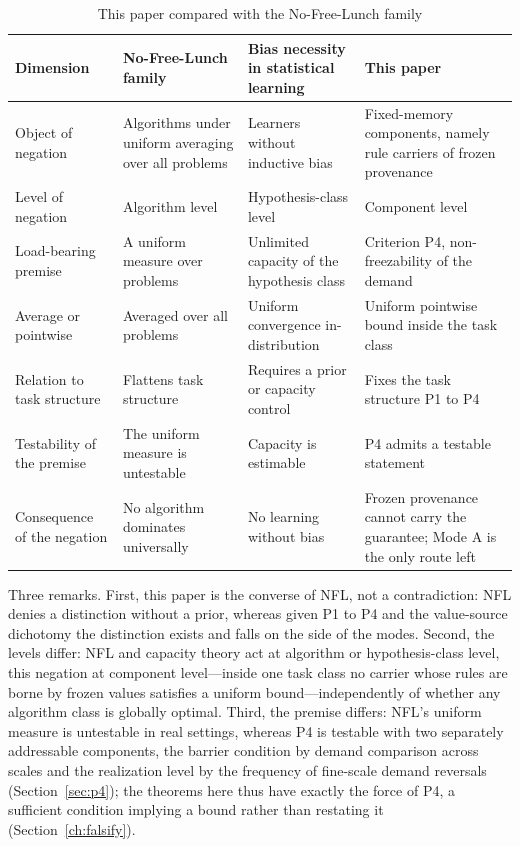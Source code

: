 \begin{table}[t]
\caption{This paper compared with the No-Free-Lunch family}
\label{tab:nfl}
\centering
\small
\begin{tabular}{@{}>{\raggedright\arraybackslash}p{}>{\raggedright\arraybackslash}p{}>{\raggedright\arraybackslash}p{}>{\raggedright\arraybackslash}p{}@{}}
\hline
\textbf{Dimension} & \textbf{No-Free-Lunch family} & \textbf{Bias necessity in statistical learning} & \textbf{This paper}\\
\hline
Object of negation & Algorithms under uniform averaging over all problems & Learners without inductive bias & Fixed-memory components, namely rule carriers of frozen provenance\\
\hline
Level of negation & Algorithm level & Hypothesis-class level & Component level\\
\hline
Load-bearing premise & A uniform measure over problems & Unlimited capacity of the hypothesis class & Criterion P4, non-freezability of the demand\\
\hline
Average or pointwise & Averaged over all problems & Uniform convergence in-distribution & Uniform pointwise bound inside the task class\\
\hline
Relation to task structure & Flattens task structure & Requires a prior or capacity control & Fixes the task structure P1 to P4\\
\hline
Testability of the premise & The uniform measure is untestable & Capacity is estimable & P4 admits a testable statement\\
\hline
Consequence of the negation & No algorithm dominates universally & No learning without bias & Frozen provenance cannot carry the guarantee; Mode A is the only route left\\
\hline
\end{tabular}
\end{table}

Three remarks. First, this paper is the converse of NFL, not a contradiction: NFL denies a distinction without a prior, whereas given P1 to P4 and the value-source dichotomy the distinction exists and falls on the side of the modes. Second, the levels differ: NFL and capacity theory act at algorithm or hypothesis-class level, this negation at component level---inside one task class no carrier whose rules are borne by frozen values satisfies a uniform bound---independently of whether any algorithm class is globally optimal. Third, the premise differs: NFL's uniform measure is untestable in real settings, whereas P4 is testable with two separately addressable components, the barrier condition by demand comparison across scales and the realization level by the frequency of fine-scale demand reversals (Section~\ref{sec:p4}); the theorems here thus have exactly the force of P4, a sufficient condition implying a bound rather than restating it (Section~\ref{ch:falsify}).

